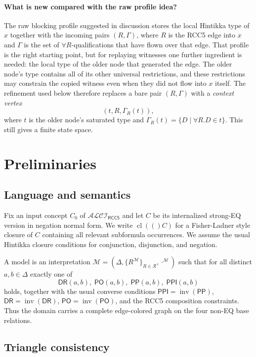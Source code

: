 \documentclass[11pt]{article}
\theoremstyle{definition}
\newcommand{\ALCIRCCFive}{\mathcal{ALCI}_{\mathsf{RCC5}}}
\newcommand{\Roles}{\mathcal{R}}
\newcommand{\DR}{\mathsf{DR}}
\newcommand{\PO}{\mathsf{PO}}
\newcommand{\PP}{\mathsf{PP}}
\newcommand{\PPI}{\mathsf{PPI}}
\newcommand{\inv}{\operatorname{inv}}
\newcommand{\cl}[1]{\operatorname{cl}(#1)}
\begin{document}
\paragraph{What is new compared with the raw profile idea?}
The raw blocking profile suggested in discussion stores the local Hintikka type of $x$ together with the incoming pairs $(R,\Gamma)$, where $R$ is the RCC5 edge into $x$ and $\Gamma$ is the set of $\forall R$-qualifications that have flown over that edge. That profile is the right starting point, but for replaying witnesses one further ingredient is needed: the local type of the older node that generated the edge. The older node's type contains all of its other universal restrictions, and these restrictions may constrain the copied witness even when they did not flow into $x$ itself. The refinement used below therefore replaces a bare pair $(R,\Gamma)$ with a \emph{context vertex}
\[
(t,R,\Gamma_R(t)),
\]
where $t$ is the older node's saturated type and $\Gamma_R(t)=\{D\mid \forall R.D\in t\}$. This still gives a finite state space.

\section{Preliminaries}

\subsection{Language and semantics}

Fix an input concept $C_0$ of $\ALCIRCCFive$ and let $C$ be its internalized strong-EQ version in negation normal form. We write $\cl(C)$ for a Fisher-Ladner style closure of $C$ containing all relevant subformula occurrences. We assume the usual Hintikka closure conditions for conjunction, disjunction, and negation.

A model is an interpretation $\mathcal M=(\Delta,\{R^{\mathcal M}\}_{R\in\Roles},\cdot^{\mathcal M})$ such that for all distinct $a,b\in\Delta$ exactly one of
\[
\DR(a,b),\;\PO(a,b),\;\PP(a,b),\;\PPI(a,b)
\]
holds, together with the usual converse conditions $\PPI=\inv(\PP)$, $\DR=\inv(\DR)$, $\PO=\inv(\PO)$, and the RCC5 composition constraints. Thus the domain carries a complete edge-colored graph on the four non-EQ base relations.

\subsection{Triangle consistency}
\end{document}
